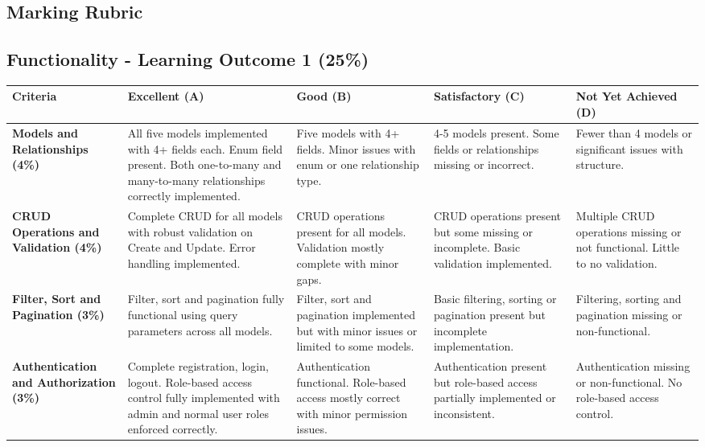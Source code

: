 \documentclass{article}
\begin{document}
\begin{landscape}

\section*{Marking Rubric}

\subsection*{Functionality - Learning Outcome 1 (25\%)}

\renewcommand{\arraystretch}{1.3}
\begin{tabular}{|p{5cm}|p{4cm}|p{4cm}|p{4cm}|p{4cm}|}
\hline
\textbf{Criteria} & \textbf{Excellent (A)} & \textbf{Good (B)} & \textbf{Satisfactory (C)} & \textbf{Not Yet Achieved (D)} \\ \hline

\textbf{Models and Relationships (4\%)} & 
All five models implemented with 4+ fields each. Enum field present. Both one-to-many and many-to-many relationships correctly implemented. & 
Five models with 4+ fields. Minor issues with enum or one relationship type. & 
4-5 models present. Some fields or relationships missing or incorrect. & 
Fewer than 4 models or significant issues with structure. \\ \hline

\textbf{CRUD Operations and Validation (4\%)} & 
Complete CRUD for all models with robust validation on Create and Update. Error handling implemented. & 
CRUD operations present for all models. Validation mostly complete with minor gaps. & 
CRUD operations present but some missing or incomplete. Basic validation implemented. & 
Multiple CRUD operations missing or not functional. Little to no validation. \\ \hline

\textbf{Filter, Sort and Pagination (3\%)} & 
Filter, sort and pagination fully functional using query parameters across all models. & 
Filter, sort and pagination implemented but with minor issues or limited to some models. & 
Basic filtering, sorting or pagination present but incomplete implementation. & 
Filtering, sorting and pagination missing or non-functional. \\ \hline

\textbf{Authentication and Authorization (3\%)} & 
Complete registration, login, logout. Role-based access control fully implemented with admin and normal user roles enforced correctly. & 
Authentication functional. Role-based access mostly correct with minor permission issues. & 
Authentication present but role-based access partially implemented or inconsistent. & 
Authentication missing or non-functional. No role-based access control. \\ \hline


\end{tabular}
\end{landscape}
\end{document}
